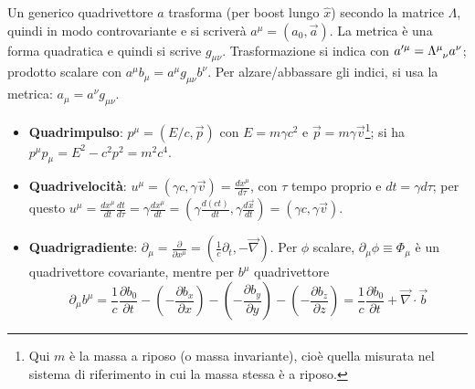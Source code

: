 \documentclass[10pt, a4paper]{scrartcl}
\numberwithin{equation}{subsection}
\theoremstyle{style1}
\begin{document}
Un generico quadrivettore $a$ trasforma (per boost lungo $\hat{x}$) secondo la matrice $\Lambda$, quindi in modo controvariante e si scriver\`a $a^\mu =(a_0,\vec{a})$. La metrica \`e una forma quadratica e quindi si scrive $g_{\mu \nu}$. Trasformazione si indica con $a'^\mu = \Lambda\indices{^\mu  _\nu} a^\nu $; prodotto scalare con $a^\mu b_\mu = a^\mu g_{\mu \nu} b^\nu$. Per alzare/abbassare gli indici, si usa la metrica: $a_\mu  = a^\nu g_{\mu \nu} $.
\begin{itemize}
	\item \textbf{Quadrimpulso}: $p^\mu = (E / c, \vec{p})$ con $E = m\gamma c^2$ e $\vec{p}=m \gamma \vec{v}$\footnote{Qui $m$ \`e la massa a riposo (o massa invariante), cio\`e quella misurata nel sistema di riferimento in cui la massa stessa \`e a riposo.}; si ha $p^\mu p_\mu  = E^2 - c^2 p^2 = m^2 c^4$. 

	\item \textbf{Quadrivelocit\`a}: $u^\mu  = (\gamma c, \gamma\vec{v}) = \frac{d x^\mu }{d \tau } $, con $\tau $ tempo proprio e $dt = \gamma d\tau $; per questo $u^\mu  = \frac{d x^\mu }{d t} \frac{d t }{d \tau } = \gamma \frac{d x^\mu }{d t} = \left(\gamma \frac{d (ct)}{d t} , \gamma \frac{d \vec{x}}{d t} \right) = (\gamma c, \gamma\vec{v}) $.
	\item \textbf{Quadrigradiente}: $\partial _\mu =\frac{\partial }{\partial x^\mu } = \left(\frac{1}{c}\partial _t, - \vec{\nabla }\right) $. Per $\phi $ scalare, $\partial _\mu \phi \equiv \Phi_\mu $ \`e un quadrivettore covariante, mentre per $b^\mu $ quadrivettore
\[
\partial _\mu  b^\mu = \frac{1}{c}\frac{\partial b_0}{\partial t } - \left(-\frac{\partial b_x}{\partial x} \right) - \left(-\frac{\partial b_y}{\partial y}\right) - \left(- \frac{\partial b_z}{\partial z}\right) = \frac{1}{c} \frac{\partial b_0}{\partial t} + \vec{\nabla }\cdot \vec{b}
\] 


\end{itemize}
\end{document}
